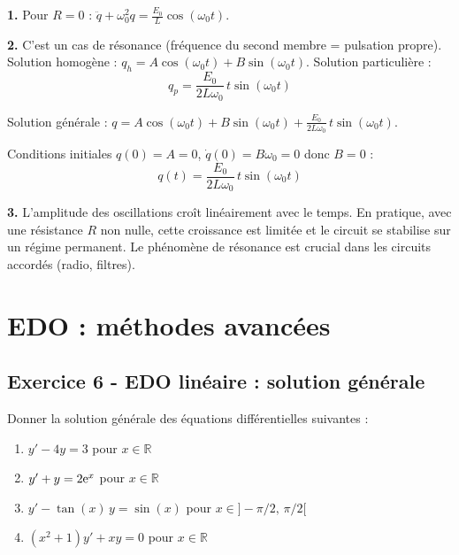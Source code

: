 \documentclass[12pt,a4paper]{article}
\begin{document}
\begin{boitecorrige}
\textbf{1.} Pour $R=0$ : $\ddot{q} + \omega_0^2 q = \frac{E_0}{L}\cos(\omega_0 t)$.

\textbf{2.} C'est un cas de résonance (fréquence du second membre = pulsation propre). Solution homogène : $q_h = A\cos(\omega_0 t) + B\sin(\omega_0 t)$. Solution particulière :
\[
q_p = \frac{E_0}{2L\omega_0}\,t\sin(\omega_0 t)
\]

Solution générale : $q = A\cos(\omega_0 t) + B\sin(\omega_0 t) + \frac{E_0}{2L\omega_0}\,t\sin(\omega_0 t)$.

Conditions initiales $q(0) = A = 0$, $\dot{q}(0) = B\omega_0 = 0$ donc $B = 0$ :
\[
\boxed{q(t) = \frac{E_0}{2L\omega_0}\,t\sin(\omega_0 t)}
\]

\textbf{3.} L'amplitude des oscillations croît linéairement avec le temps. En pratique, avec une résistance $R$ non nulle, cette croissance est limitée et le circuit se stabilise sur un régime permanent. Le phénomène de résonance est crucial dans les circuits accordés (radio, filtres).
\end{boitecorrige}


\section{EDO : méthodes avancées}

\subsection*{Exercice 6 - EDO linéaire : solution générale \niveau{\moyen}}

\begin{boiteexercice}
Donner la solution générale des équations différentielles suivantes :
\begin{enumerate}[label=(\alph*)]
  \item $y' - 4y = 3$ pour $x \in \mathbb{R}$
  \item $y' + y = 2\mathrm{e}^x$ pour $x \in \mathbb{R}$
  \item $y' - \tan(x)\,y = \sin(x)$ pour $x \in ]-\pi/2,\,\pi/2[$
  \item $(x^2+1)y' + xy = 0$ pour $x \in \mathbb{R}$
\end{enumerate}
\end{boiteexercice}
\end{document}
